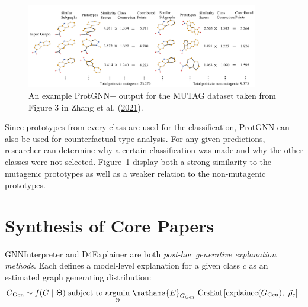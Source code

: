 \documentclass[
  11pt,
  letterpaper,
]{article}
\begin{document}
\begin{figure}

{\centering \includegraphics[width=0.9\textwidth,height=\textheight]{figures/prot_inference_ex.png}

}

\caption{\label{fig-prot-diagram}An example ProtGNN+ output for the
MUTAG dataset taken from Figure 3 in Zhang et al.
(\protect\hyperlink{ref-Zhang_Liu_Wang_Lu_Lee_2021}{2021}).}

\end{figure}

Since prototypes from every class are used for the classification,
ProtGNN can also be used for counterfactual type analysis. For any given
predictions, researcher can determine why a certain classification was
made and why the other classes were not selected.
Figure~\ref{fig-prot-diagram} display both a strong similarity to the
mutagenic prototypes as well as a weaker relation to the non-mutagenic
prototypes.

\hypertarget{synthesis-of-core-papers}{%
\section{Synthesis of Core Papers}\label{synthesis-of-core-papers}}

\quad GNNInterpreter and D4Explainer are both \emph{post-hoc generative
explanation methods}. Each defines a model-level explanation for a given
class \(c\) as an estimated graph generating distribution:\\
\begin{equation}
    G_\text{Gen} \sim f(G \ | \ \Theta) \text{ subject to } \underset{\Theta}{\text{argmin}}\ \mathams{E}_{G_\text{Gen}} \ \text{CrsEnt}\left[\text{explainee}(G_\text{Gen}), \ \tilde{\rho_c}\right].
\end{equation}
\end{document}

